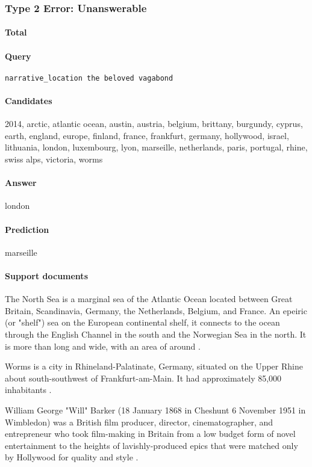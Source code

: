 \documentclass{article} \usepackage{iclr2019_conference,times}
\begin{document}
\subsubsection{Type 2 Error: Unanswerable}

\paragraph{Total}


\paragraph{Query} \texttt{narrative\_location the beloved vagabond}

\paragraph{Candidates}
2014, arctic, atlantic ocean, austin, austria, belgium, brittany, burgundy, cyprus, earth, england, europe, finland, france, frankfurt, germany, hollywood, israel, lithuania, london, luxembourg, lyon, marseille, netherlands, paris, portugal, rhine, swiss alps, victoria, worms

\paragraph{Answer} london

\paragraph{Prediction} marseille

\paragraph{Support documents}

The North Sea is a marginal sea of the Atlantic Ocean located between Great Britain, Scandinavia, Germany, the Netherlands, Belgium, and France. An epeiric (or "shelf") sea on the European continental shelf, it connects to the ocean through the English Channel in the south and the Norwegian Sea in the north. It is more than long and wide, with an area of around .

Worms is a city in Rhineland-Palatinate, Germany, situated on the Upper Rhine about south-southwest of Frankfurt-am-Main.
It had approximately 85,000 inhabitants .

William George "Will" Barker (18 January 1868 in Cheshunt  6 November 1951 in Wimbledon) was a British film producer, director, cinematographer, and entrepreneur who took film-making in Britain from a low budget form of novel entertainment to the heights of lavishly-produced epics that were matched only by Hollywood for quality and style .
\end{document}
